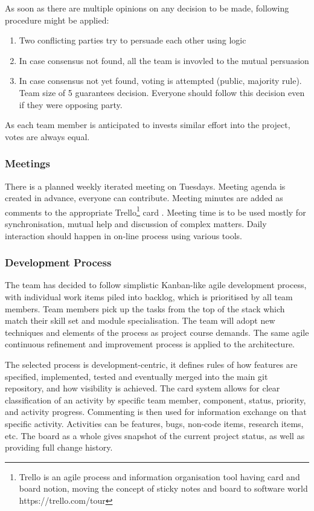 As soon as there are multiple opinions on any decision to be made, following procedure might be applied:

\begin{enumerate}
    \item Two conflicting parties try to persuade each other using logic
    \item In case consensus not found, all the team is invovled to the mutual persuasion
    \item In case consensus not yet found, voting is attempted (public, majority rule). Team size of 5 guarantees decision.
        Everyone should follow this decision even if they were opposing party.
\end{enumerate}

As each team member is anticipated to invests similar effort into the project, votes are always equal.
\subsubsection {Meetings}
There is a planned weekly iterated meeting on Tuesdays. Meeting agenda is created in advance, everyone can
contribute. Meeting minutes are added as comments to the appropriate Trello\footnote{Trello is an agile process and information organisation tool having card and board notion, moving the concept of sticky notes and board to software world https://trello.com/tour} card
. Meeting time is to be used mostly for synchronisation, mutual help and discussion of
 complex matters. Daily interaction should happen in on-line process using various tools.

\subsubsection{Development Process}
The team has decided to follow simplistic Kanban-like\cite{Ahmed} agile development process, with individual work items piled into backlog,
which is prioritised by all team members. Team members pick up the tasks from the top of the stack which match their skill set
and module specialisation. The team will adopt new techniques and elements of the process as project course demands.
The same agile continuous refinement and improvement process is applied to the architecture.

The selected process is development-centric, it defines rules of how features are specified, implemented, tested and eventually
merged into the main git repository, and how visibility is achieved. The card system allows for clear classification of an activity by specific team member, component, status, priority, and activity progress. Commenting is then used for information exchange on that specific activity. Activities can be features, bugs, non-code items, research items, etc. The board as a whole gives snapshot of the current project status, as well as providing full change history.

